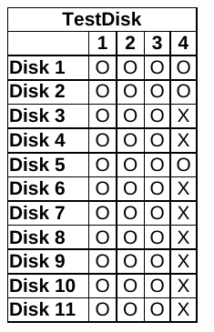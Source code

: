\begin{paraphrase}
\begin{figure}
\begin{subfigure}[t]{0.17\linewidth}
        \includegraphics[width=\linewidth]{fig/testdisk_results_fat.pdf}
    \end{subfigure}~~
    \begin{subfigure}[t]{0.17\linewidth}

\end{subfigure}
\end{figure}
\end{paraphrase}
